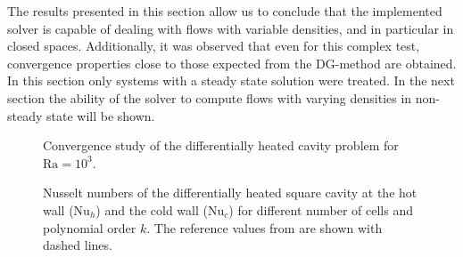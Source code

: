 The results presented in this section allow us to conclude that the implemented solver is capable of dealing with flows with variable densities, and in particular in closed spaces. Additionally, it was observed that even for this complex test, convergence properties close to those expected from the DG-method are obtained. In this section only systems with a steady state solution were treated. In the next section the ability of the solver to compute flows with varying densities in non-steady state will be shown.

\begin{figure}[tb]
	\centering
	\pgfplotsset{width=0.34\textwidth, compat=1.3}
	\caption{Convergence study of the differentially heated cavity problem for $\text{Ra} = 10^3$.}\label{fig:ConvergenceDHC}
\end{figure}
\begin{figure}[tb]
	\centering
	\caption[Nusselt numbers of the differentially heated square cavity at the hot wall ($\text{Nu}_h$) and the cold wall ($\text{Nu}_c$) for different number of cells and polynomial order $k$.]{Nusselt numbers of the differentially heated square cavity at the hot wall ($\text{Nu}_h$) and the cold wall ($\text{Nu}_c$) for different number of cells and polynomial order $k$. The reference values from \textcite{vierendeelsBenchmarkSolutionsNatural2003} are shown with dashed lines.}\label{fig:NusseltStudy}
\end{figure}
\FloatBarrier
